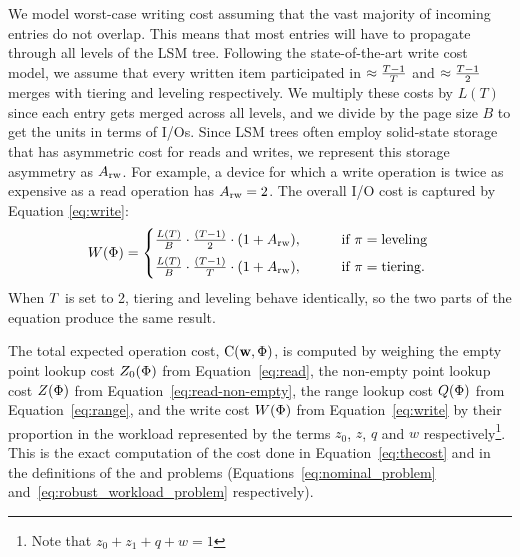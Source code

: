 We model worst-case writing cost assuming that the vast majority 
    of incoming entries do not overlap. 
This means that most entries will have to propagate through all levels of the
    LSM tree.
Following the state-of-the-art write cost model, we assume that every 
    written item participated in $\approx \frac{{{T}}-1}{{{T}}}$ and
    $\approx \frac{{{T}}-1}{2}$ merges with tiering and leveling 
    respectively.
We multiply these costs by $L(T)$ since each entry gets merged across all 
    levels, and we divide by the page size $B$ to get the units in terms of 
    I/Os.  
Since LSM trees often employ solid-state storage that has asymmetric cost for 
    reads and writes, we represent this storage asymmetry as ${{A_\mathrm{rw}}}$. 
For example, a device for which a write operation is twice as expensive as a 
    read operation has ${{A_\mathrm{rw}}}=2$.  
The overall I/O cost is captured by Equation \eqref{eq:write}:
\begin{equation} 
\label{eq:write}
W({{\Phi}}) = 
\begin{cases}
    \frac{L(T)}{B} \cdot  \frac{ ({{T}}-1)}{2  } \cdot (1 + {{A_\mathrm{rw}}}) ,  ~~ & \text{if } {{\ensuremath{\pi}}}=\text{leveling}\\[5pt]
    \frac{L(T)}{B} \cdot  \frac{ ({{T}}-1)}{{{T}}  } \cdot (1 + {{A_\mathrm{rw}}}) ,  \qquad    & \text{if }
    {{\ensuremath{\pi}}}=\text{tiering.}  \\
\end{cases}  \\
\end{equation}
When ${{T}}$ is set to 2, tiering and leveling behave identically, so the 
    two parts of the equation produce the same result. 
 
The total expected operation cost,
    ${{\text{C}}}({{\bf{w}}}, {{\Phi}})$, is computed by 
    weighing the empty point lookup cost $Z_0({{\Phi}})$ from 
    Equation~\eqref{eq:read}, the non-empty point lookup cost 
    $Z({{\Phi}})$ from Equation~\eqref{eq:read-non-empty}, the range 
    lookup cost $Q({{\Phi}})$ from Equation~\eqref{eq:range}, and the
    write cost $W({{\Phi}})$ from Equation~\eqref{eq:write} by their 
    proportion in the workload represented by the terms $z_0$, $z$, $q$ and $w$ 
    respectively\footnote{Note that $z_0 + z_1 + q + w = 1$}.  
This is the exact computation of the cost done in Equation~\eqref{eq:thecost}
    and in the definitions of the {\nominal} and {\robustw} problems
    (Equations~\eqref{eq:nominal_problem} and~\eqref{eq:robust_workload_problem}
    respectively).
